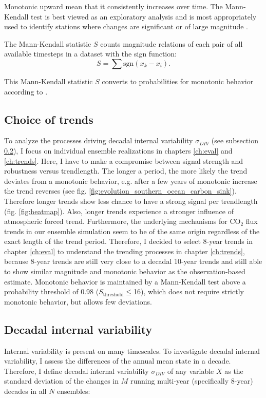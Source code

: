 Monotonic upward mean that it consistently increases over time. The Mann-Kendall test is best viewed as an exploratory analysis and is most appropriately used to identify stations where changes are significant or of large magnitude \citep{Hirsch1982}.

The Mann-Kendall statistic $S$ counts magnitude relations of each pair of all available timesteps in a dataset with the sign function: 
\[ S= \sum \text{sgn} \left( x_k - x_i \right). \]

This Mann-Kendall statistic $S$ converts to probabilities for monotonic behavior according to \cite{Gilbert1987}.

\subsection{Choice of trends} 
\label{sec:choicetrend}
To analyze the processes driving decadal internal variability $\sigma_{DIV}$ (see subsection \ref{sec:DIV}), I focus on individual ensemble realizations in chapters \ref{ch:eval} and \ref{ch:trends}. Here, I have to make a compromise between signal strength and robustness versus trendlength. The longer a period, the more likely the trend deviates from a monotonic behavior, e.g. after a few years of monotonic increase the trend reverses (see fig. \ref{fig:evolution_southern_ocean_carbon_sink}). Therefore longer trends show less chance to have a strong signal per trendlength (fig. \ref{fig:heatmap}). Also, longer trends experience a stronger influence of atmospheric forced trend. Furthermore, the underlying mechanisms for CO$_2$ flux trends in our ensemble simulation seem to be of the same origin regardless of the exact length of the trend period. Therefore, I decided to select 8-year trends in chapter \ref{ch:eval} to understand the trending processes in chapter \ref{ch:trends}, because 8-year trends are still very close to a decadal 10-year trends and still able to show similar magnitude and monotonic behavior as the observation-based estimate. 
Monotonic behavior is maintained by a Mann-Kendall test above a probability threshold of 0.98 ($S_{\text{threshold}} \leq$16), which does not require strictly monotonic behavior, but allows few deviations.

\subsection{Decadal internal variability}
\label{sec:DIV}
Internal variability is present on many timescales. To investigate decadal internal variability, I assess the differences of the annual mean state in a decade. Therefore, I define decadal internal variability $\sigma_{DIV}$ of any variable $X$ as the standard deviation of the changes in $M$ running multi-year (specifically 8-year) decades in all $N$ ensembles:

